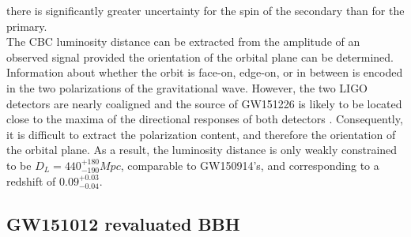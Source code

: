 \documentclass[binding=0.6cm, LaM]{sapthesis}
\begin{document}
	there is significantly greater uncertainty for the spin of the secondary than for the primary. \\
	The CBC luminosity distance can be extracted from the amplitude of an observed signal provided the orientation of the orbital plane can be determined. 
	Information about whether the orbit is face-on, edge-on, or in between is encoded in the two polarizations of the gravitational wave. 
	However, the two LIGO detectors are nearly coaligned and the source of GW151226 is likely to be located close to the maxima of the directional responses of both detectors \cite{28}. 
	Consequently, it is difficult to extract the polarization content, and therefore the orientation of the orbital plane. 
	As a result, the luminosity distance is only weakly constrained to be $D_L = 440^{+180}_{-190}Mpc$, comparable to GW150914’s, and corresponding to a redshift of $0.09^{+0.03}_{-0.04}$.
		
\subsection{GW151012 revaluated BBH}
	
\end{document}
